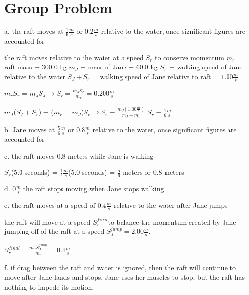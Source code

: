 \chapter{Group Problem}
\label{Group Problem}
a. the raft moves at $\frac{1}{6} \frac{m}{s}$ or $0.2 \frac{m}{s}$ relative to the water, once significant figures are accounted for

the raft moves relative to the water at a speed $S_{r}$ to conserve momentum
$m_{r}$ = raft mass = $300.0$ kg
$m_{J}$ = mass of Jane = $60.0$ kg
$S_{J}$ = walking speed of Jane relative to the water
$S_{J} + S_{r}$ = walking speed of Jane relative to raft = $1.00 \frac{m}{s}$

$m_{r} S_{r}$ = $m_{J} S_{J} \rightarrow S_{r} = \frac{m_{J} S_{J}}{m_{r}} = 0.200 \frac{m}{s}$ 

$m_{J}$($S_{J} + S_{r}$) = ($m_{r}$ + $m_{J}$)$S_{r} \rightarrow S_{r} = \frac{m_{J}(1.00 \frac{m}{s})}{m_{J} + m_{r} } $
$S_{r} = \frac{1}{6} \frac{m}{s}$

b. Jane moves at $\frac{5}{6} \frac{m}{s}$ or $0.8 \frac{m}{s}$ relative to the water, once significant figures are accounted for

c. the raft moves $0.8$ meters while Jane is walking

$S_{r}$(5.0 seconds) = $\frac{1}{6} \frac{m}{s}$(5.0 seconds) = $\frac{5}{6}$ meters or $0.8$ meters

d. $0 \frac{m}{s}$ the raft stops moving when Jane stops walking

e. the raft moves at a speed of $0.4 \frac{m}{s}$ relative to the water after Jane jumps

the raft will move at a speed $S_{r}^{final}$to balance the momentum created by Jane 
jumping off of the raft at a speed $S_{J}^{jump} = 2.00 \frac{m}{s}$.

$S_{r}^{final} = \frac{ m_{J} S_{J}^{jump}}{m_{r}} = 0.4 \frac{m}{s}$

f. if drag between the raft and water is ignored, then the raft will continue to move
after Jane lands and stops.  Jane uses her muscles to stop, but the raft has nothing
to impede its motion.
